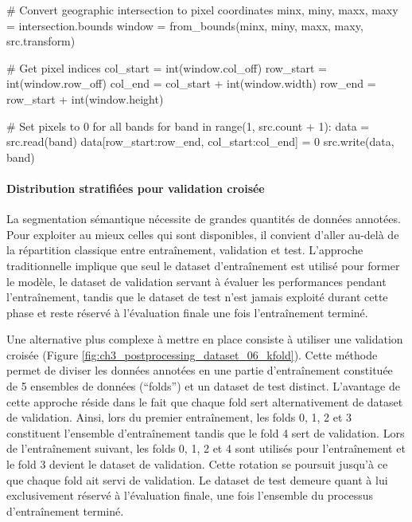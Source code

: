 \begin{code}[H]
\begin{pythoncode}
                # Convert geographic intersection to pixel coordinates
                minx, miny, maxx, maxy = intersection.bounds
                window = from_bounds(minx, miny, maxx, maxy, src.transform)
                
                # Get pixel indices
                col_start = int(window.col_off)
                row_start = int(window.row_off) 
                col_end = col_start + int(window.width)
                row_end = row_start + int(window.height)
                
                # Set pixels to 0 for all bands
                for band in range(1, src.count + 1):
                    data = src.read(band)
                    data[row_start:row_end, col_start:col_end] = 0
                    src.write(data, band)
    \end{pythoncode}
    \label{code:post_traitement_masquage_selectif}
\end{code}

\paragraph{Distribution stratifiées pour validation croisée}
La segmentation sémantique nécessite de grandes quantités de données annotées. Pour exploiter au mieux celles qui sont disponibles, il convient d'aller au-delà de la répartition classique entre entraînement, validation et test. L'approche traditionnelle implique que seul le dataset d'entraînement est utilisé pour former le modèle, le dataset de validation servant à évaluer les performances pendant l'entraînement, tandis que le dataset de test n'est jamais exploité durant cette phase et reste réservé à l'évaluation finale une fois l'entraînement terminé.

Une alternative plus complexe à mettre en place consiste à utiliser une validation croisée (Figure \ref{fig:ch3_postprocessing_dataset_06_kfold}). Cette méthode permet de diviser les données annotées en une partie d'entraînement constituée de 5 ensembles de données (``folds'') et un dataset de test distinct. L'avantage de cette approche réside dans le fait que chaque fold sert alternativement de dataset de validation. Ainsi, lors du premier entraînement, les folds 0, 1, 2 et 3 constituent l'ensemble d'entraînement tandis que le fold 4 sert de validation. Lors de l'entraînement suivant, les folds 0, 1, 2 et 4 sont utilisés pour l'entraînement et le fold 3 devient le dataset de validation. Cette rotation se poursuit jusqu'à ce que chaque fold ait servi de validation. Le dataset de test demeure quant à lui exclusivement réservé à l'évaluation finale, une fois l'ensemble du processus d'entraînement terminé.


